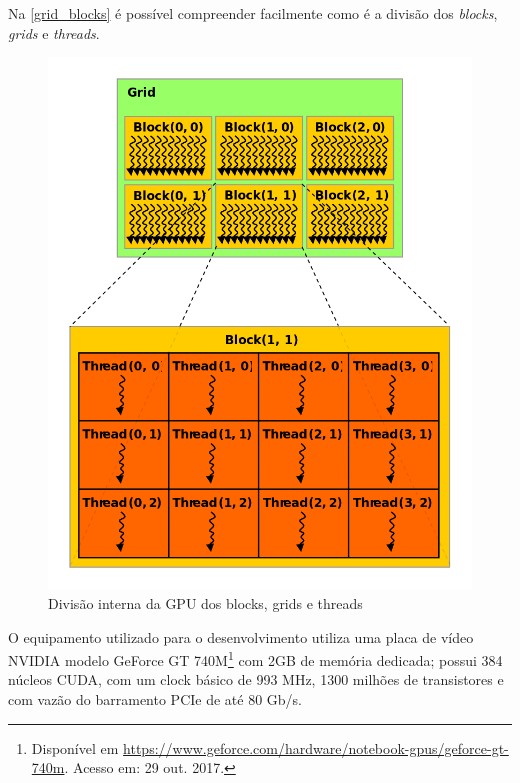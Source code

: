 \documentclass[
	12pt,				%
	twoside,			%
	a4paper,			%
	english,			%
	french,				%
	spanish,			%
	brazil				%
	]{abntex2}
\begin{document}


Na \autoref{grid_blocks} é possível compreender facilmente como é a
divisão dos \emph{blocks}, \emph{grids} e \emph{threads}.

\begin{figure}[ht]
    \caption{\label{grid_blocks} Divisão interna da GPU dos blocks, grids e threads}
    \begin{center}
        \includegraphics[scale=0.4]{imagens/block-grid.jpg}
    \end{center}
\end{figure}

O equipamento utilizado para o desenvolvimento utiliza uma placa de
vídeo NVIDIA modelo GeForce GT 740M\footnote{Disponível em
  \url{https://www.geforce.com/hardware/notebook-gpus/geforce-gt-740m}.
  Acesso em: 29 out. 2017.} com 2GB de memória dedicada; possui 384
núcleos CUDA, com um clock básico de 993 MHz, 1300 milhões de
transistores e com vazão do barramento PCIe de até 80 Gb/s.
\end{document}
